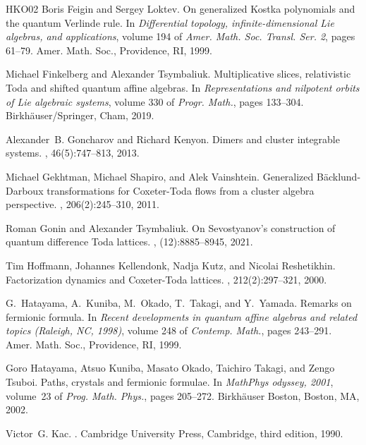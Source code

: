 \documentclass[12pt]{amsart}
\numberwithin{equation}{section}
\begin{document}
\begin{thebibliography}{HKO{\etalchar{+}}02}
Boris Feigin and Sergey Loktev.
\newblock On generalized {K}ostka polynomials and the quantum {V}erlinde rule.
\newblock In {\em Differential topology, infinite-dimensional {L}ie algebras,
  and applications}, volume 194 of {\em Amer. Math. Soc. Transl. Ser. 2}, pages
  61--79. Amer. Math. Soc., Providence, RI, 1999.

Michael Finkelberg and Alexander Tsymbaliuk.
\newblock Multiplicative slices, relativistic {T}oda and shifted quantum affine
  algebras.
\newblock In {\em Representations and nilpotent orbits of {L}ie algebraic
  systems}, volume 330 of {\em Progr. Math.}, pages 133--304.
  Birkh\"{a}user/Springer, Cham, 2019.

Alexander~B. Goncharov and Richard Kenyon.
\newblock Dimers and cluster integrable systems.
, 46(5):747--813, 2013.

Michael Gekhtman, Michael Shapiro, and Alek Vainshtein.
\newblock Generalized {B}\"{a}cklund-{D}arboux transformations for
  {C}oxeter-{T}oda flows from a cluster algebra perspective.
, 206(2):245--310, 2011.

Roman Gonin and Alexander Tsymbaliuk.
\newblock On {S}evostyanov's construction of quantum difference {T}oda
  lattices.
, (12):8885--8945, 2021.

Tim Hoffmann, Johannes Kellendonk, Nadja Kutz, and Nicolai Reshetikhin.
\newblock Factorization dynamics and {C}oxeter-{T}oda lattices.
, 212(2):297--321, 2000.

G.~Hatayama, A.~Kuniba, M.~Okado, T.~Takagi, and Y.~Yamada.
\newblock Remarks on fermionic formula.
\newblock In {\em Recent developments in quantum affine algebras and related
  topics ({R}aleigh, {NC}, 1998)}, volume 248 of {\em Contemp. Math.}, pages
  243--291. Amer. Math. Soc., Providence, RI, 1999.

Goro Hatayama, Atsuo Kuniba, Masato Okado, Taichiro Takagi, and Zengo Tsuboi.
\newblock Paths, crystals and fermionic formulae.
\newblock In {\em Math{P}hys odyssey, 2001}, volume~23 of {\em Prog. Math.
  Phys.}, pages 205--272. Birkh\"{a}user Boston, Boston, MA, 2002.

Victor~G. Kac.
.
\newblock Cambridge University Press, Cambridge, third edition, 1990.


\end{thebibliography}
\end{document}
